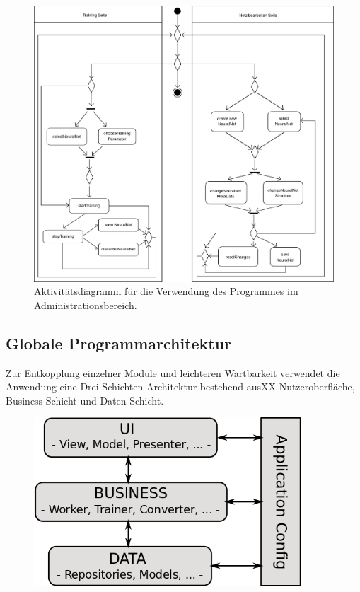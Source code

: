\begin{figure}[H]
\begin{center}
\includegraphics[width=\textwidth]{Abbildungen/UML/jan/trainingConfigAD.png}
\caption{Aktivitätsdiagramm für die Verwendung des Programmes im Administrationsbereich.}
\label{fig_trainingConfigAD}
\end{center}
\end{figure}

\subsection{Globale Programmarchitektur}

Zur Entkopplung einzelner Module und leichteren Wartbarkeit verwendet die Anwendung eine Drei-Schichten Architektur bestehend ausXX	 Nutzeroberfläche, Business-Schicht und Daten-Schicht. 
\begin{figure}[H]
\begin{center}
\includegraphics[width=10cm]{Abbildungen/UML/jan/SchichtenModell.png}
\end{center}
\end{figure}

